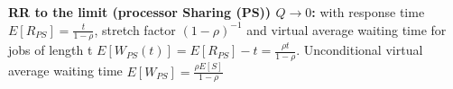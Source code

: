 \textbf{RR to the limit (processor Sharing (PS)) $Q \rightarrow 0$:} with response time $E[R_{PS}] = \frac{t}{1-\rho}$, stretch factor $(1-\rho)^{-1}$ and virtual average waiting time for jobs of length t $E[W_{PS}(t)] = E[R_{PS}] -t = \frac{\rho t}{1-\rho}$. Unconditional virtual average waiting time $E[W_{PS}] = \frac{\rho E[S]}{1-\rho}$